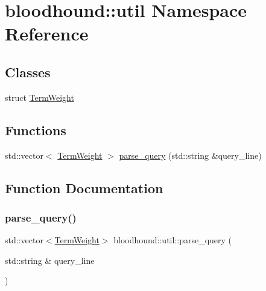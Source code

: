 \hypertarget{namespacebloodhound_1_1util}{}\section{bloodhound\+:\+:util Namespace Reference}
\label{namespacebloodhound_1_1util}
\subsection*{Classes}
\begin{DoxyCompactItemize}
\item 
struct \hyperlink{structbloodhound_1_1util_1_1TermWeight}{Term\+Weight}
\end{DoxyCompactItemize}
\subsection*{Functions}
\begin{DoxyCompactItemize}
\item 
std\+::vector$<$ \hyperlink{structbloodhound_1_1util_1_1TermWeight}{Term\+Weight} $>$ \hyperlink{namespacebloodhound_1_1util_ac751924fd0fac9f72bdd92653f93c371}{parse\+\_\+query} (std\+::string \&query\+\_\+line)
\end{DoxyCompactItemize}


\subsection{Function Documentation}
\mbox{\label{namespacebloodhound_1_1util_ac751924fd0fac9f72bdd92653f93c371}} 
\subsubsection{\texorpdfstring{parse\+\_\+query()}{parse\_query()}}
{\footnotesize\ttfamily std\+::vector$<$\hyperlink{structbloodhound_1_1util_1_1TermWeight}{Term\+Weight}$>$ bloodhound\+::util\+::parse\+\_\+query (\begin{DoxyParamCaption}\item[{std\+::string \&}]{query\+\_\+line }\end{DoxyParamCaption})}

